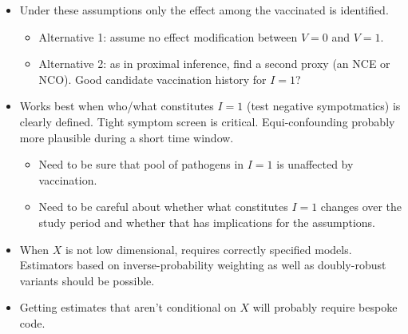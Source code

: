 \documentclass[11pt]{article}
\begin{document}
\begin{itemize}
    \item Under these assumptions only the effect among the vaccinated is identified.
    \begin{itemize}
        \item Alternative 1: assume no effect modification between $V = 0$ and $V = 1$.
        \item Alternative 2: as in proximal inference, find a second proxy (an NCE or NCO). Good candidate vaccination history for $I = 1$?
    \end{itemize}
    \item Works best when who/what constitutes $I = 1$ (test negative sympotmatics) is clearly defined. Tight symptom screen is critical. Equi-confounding probably more plausible during a short time window.
    \begin{itemize}
        \item Need to be sure that pool of pathogens in $I = 1$ is unaffected by vaccination.
        \item Need to be careful about whether what constitutes $I = 1$ changes over the study period and whether that has implications for the assumptions. 
    \end{itemize}
    \item When $X$ is not low dimensional, requires correctly specified models. Estimators based on inverse-probability weighting as well as doubly-robust variants should be possible. 
    \item Getting estimates that aren't conditional on $X$ will probably require bespoke code. 
\end{itemize}





\end{document}
